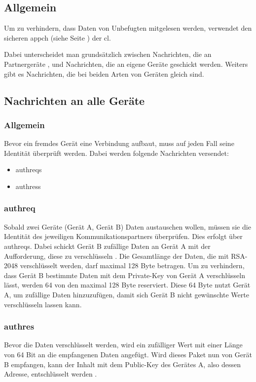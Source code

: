 \subsection{Allgemein}
Um zu verhindern, dass Daten von Unbefugten mitgelesen werden, verwendet \sblit den sicheren \gls{appch} (siehe Seite \pageref{dcl-appch}) der \gls{cl}.

Dabei unterscheidet man grundsätzlich zwischen Nachrichten, die an Partnergeräte , und Nachrichten, die an eigene Geräte geschickt werden. Weiters gibt es Nachrichten, die bei beiden Arten von Geräten gleich sind.

\subsection{Nachrichten an alle Geräte}
\subsubsection{Allgemein}
Bevor ein fremdes Gerät eine Verbindung aufbaut, muss auf jeden Fall seine Identität überprüft werden. Dabei werden folgende Nachrichten versendet:
\begin{itemize}
	\item \gls{authreq}s
	\item \gls{authres}s
\end{itemize}
\subsubsection{\gls{authreq}}

Sobald zwei Geräte (Gerät A, Gerät B) Daten austauschen wollen, müssen sie die Identität des jeweiligen Kommunikationspartners überprüfen. Dies erfolgt über \gls{authreq}s. Dabei schickt Gerät B zufällige Daten an Gerät A mit der Aufforderung, diese zu verschlüsseln . 
Die Gesamtlänge der Daten, die mit RSA-2048 verschlüsselt werden, darf maximal 128 Byte betragen. Um zu verhindern, dass Gerät B bestimmte Daten mit dem Private-Key von Gerät A verschlüsseln lässt, werden 64 von den maximal 128 Byte reserviert. Diese 64 Byte nutzt Gerät A, um zufällige Daten hinzuzufügen, damit sich Gerät B nicht gewünschte Werte verschlüsseln lassen kann.
\sblitauthreqbytefield

\subsubsection{\gls{authres}}
Bevor die Daten verschlüsselt werden, wird ein zufälliger Wert mit einer Länge von 64 Bit an die empfangenen Daten angefügt.
Wird dieses Paket nun von Gerät B empfangen, kann der Inhalt mit dem Public-Key des Gerätes A, also dessen Adresse, entschlüsselt werden .
\sblitauthresbytefield
		

